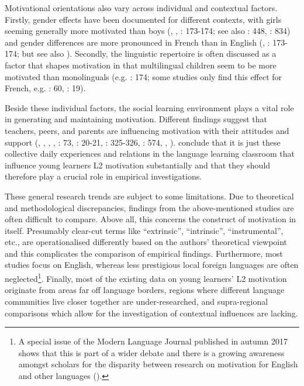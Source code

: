 \documentclass[output=paper]{langsci/langscibook}
\begin{document}
Motivational orientations also vary across individual and contextual factors. Firstly, gender effects have been documented for different contexts, with girls seeming generally more motivated than boys (\citealt{Heinzmann2009}, \citealt{Henry2009,Henry2010}, \citealt{BruehwilerLePapeRacine2017}: 173-174; see also \citealt{DoernyeiCsizer2002}: 448, \citealt{CourtneyEtAl2017}: 834) and gender differences are more pronounced in French than in English (\citealt{Holder2005}, \citealt{BruehwilerLePapeRacine2017}: 173-174; but see also \citealt{DewaeleEtAl2016}). Secondly, the linguistic repertoire is often discussed as a factor that shapes motivation in that multilingual children seem to be more motivated than monolinguals (e.g. \citealt{BruehwilerLePapeRacine2017}: 174; some studies only find this effect for French, e.g. \citealt{Stoeckli2004}: 60, \citealt{Heinzmann2010}: 19). 

Beside these individual factors, the social learning environment plays a vital role in generating and maintaining motivation. Different findings suggest that teachers, peers, and parents are influencing motivation with their attitudes and support (\citealt{NoelsEtAl1999}, \citealt{CsizerKormos2008,CsizerKormos2009}, \citealt{HusfeldtBaderLehmann2009}, \citealt{TaguchiEtAl2009}, \citealt{Iwaniec2014}: 73, \citealt{PeyerEtAl2016}: 20-21, \citealt{PfenningerSingleton2016}: 325-326, \citealt{Busse2017}: 574, \citealt{SugitaMcEownEtAl2017}, \citealt{WiedenkellerLenz2019}). \citet[336]{PfenningerSingleton2016} conclude that it is just these collective daily experiences and relations in the language learning classroom that influence young learners L2 motivation substantially and that they should therefore play a crucial role in empirical investigations.

These general research trends are subject to some limitations. Due to theoretical and methodological discrepancies, findings from the above-mentioned studies are often difficult to compare. Above all, this concerns the construct of motivation in itself. Presumably clear-cut terms like “extrinsic”, “intrinsic”, “instrumental”, etc., are operationalised differently based on the authors’ theoretical viewpoint and this complicates the comparison of empirical findings. Furthermore, most studies focus on English, whereas less prestigious local foreign languages are often neglected\footnote{A special issue of the Modern Language Journal published in autumn 2017 shows that this is part of a wider debate and there is a growing awareness amongst scholars for the disparity between research on motivation for English and other languages (\citealt{UshiodaDoernyei2017}).}. Finally, most of the existing data on young learners’ L2 motivation originate from areas far off language borders, regions where different language communities live closer together are under-researched, and supra-regional comparisons which allow for the investigation of contextual influences are lacking.
\end{document}

